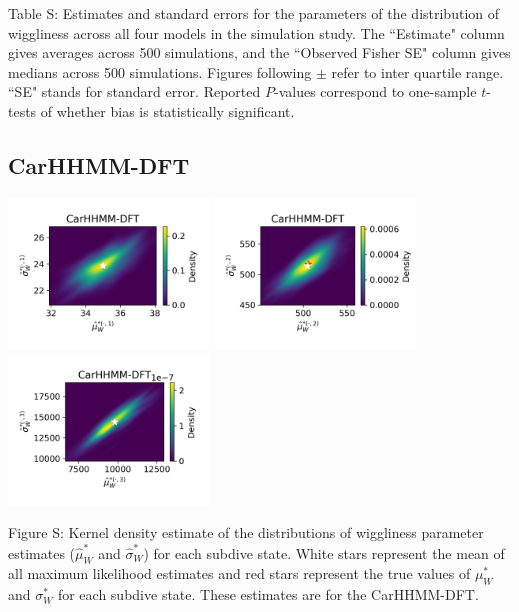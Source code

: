 \documentclass{article}
\begin{document}
        \noindent Table S: Estimates and standard errors for the parameters of the distribution of wiggliness across all four models in the simulation study. The ``Estimate" column gives averages across 500 simulations, and the ``Observed Fisher SE" column gives medians across 500 simulations. Figures following $\pm$ refer to inter quartile range. ``SE" stands for standard error. Reported $P$-values correspond to one-sample $t$-tests of whether bias is statistically significant.
        \addtocounter{tablenum}{1}
        
        \newpage
    
        \subsection{CarHHMM-DFT}
        \begin{center}
        \includegraphics[width=2.1in]{../Plots/hhmm_FV_MLE_density_FoVeDBA_0_0.png}
        \includegraphics[width=2.1in]{../Plots/hhmm_FV_MLE_density_FoVeDBA_0_1.png}
        \includegraphics[width=2.1in]{../Plots/hhmm_FV_MLE_density_FoVeDBA_0_2.png}
        \end{center}
        
        \noindent Figure S: Kernel density estimate of the distributions of wiggliness parameter estimates ($\hat \mu^*_W$ and $\hat \sigma^*_W$) for each subdive state. White stars represent the mean of all maximum likelihood estimates and red stars represent the true values of $\mu^*_W$ and $\sigma^*_W$ for each subdive state. These estimates are for the CarHHMM-DFT.
        \addtocounter{fignum}{1}
        
\end{document}
